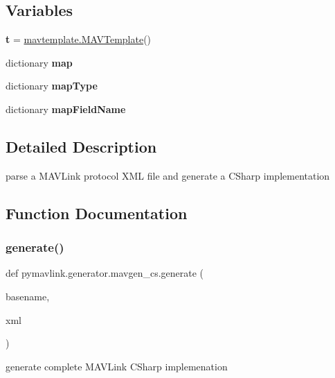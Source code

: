 \subsection*{Variables}
\begin{DoxyCompactItemize}
\item 
\mbox{\label{namespacepymavlink_1_1generator_1_1mavgen__cs_afd765216770d275a8155a15fcea9e228}} 
{\bfseries t} = \hyperlink{classpymavlink_1_1generator_1_1mavtemplate_1_1MAVTemplate}{mavtemplate.\+M\+A\+V\+Template}()
\item 
dictionary {\bfseries map}
\item 
dictionary {\bfseries map\+Type}
\item 
dictionary {\bfseries map\+Field\+Name}
\end{DoxyCompactItemize}


\subsection{Detailed Description}
\begin{DoxyVerb}parse a MAVLink protocol XML file and generate a CSharp implementation\end{DoxyVerb}
 

\subsection{Function Documentation}
\mbox{\label{namespacepymavlink_1_1generator_1_1mavgen__cs_a401ce8f84466bcf2b9247fab7f057fd2}} 
\subsubsection{\texorpdfstring{generate()}{generate()}}
{\footnotesize\ttfamily def pymavlink.\+generator.\+mavgen\+\_\+cs.\+generate (\begin{DoxyParamCaption}\item[{}]{basename,  }\item[{}]{xml }\end{DoxyParamCaption})}

\begin{DoxyVerb}generate complete MAVLink CSharp implemenation\end{DoxyVerb}
 

